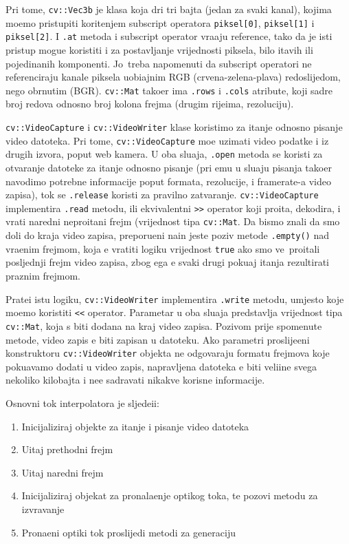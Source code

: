 Pri tome, \lstinline{cv::Vec3b} je klasa koja dr\zh i tri bajta (jedan za svaki kanal), kojima mo\zh emo pristupiti kori\sh tenjem subscript operatora \lstinline{piksel[0]}, \lstinline{piksel[1]} i \lstinline{piksel[2]}. 
I \lstinline{.at} metoda i subscript operator vra\cj aju reference, tako da je isti pristup mogu\cj e koristiti i za postavljanje vrijednosti piksela, bilo \ch itavih ili pojedina\ch nih komponenti. 
Jo\sh\ treba napomenuti da subscript operatori ne referenciraju kanale piksela uobi\ch ajnim RGB (crvena-zelena-plava) redoslijedom, nego obrnutim (BGR). \lstinline{cv::Mat} tako\dj er ima \lstinline{.rows} i 
\lstinline{.cols} atribute, koji sadr\zh e broj redova odnosno broj kolona frejma (drugim rije\ch ima, rezoluciju).

\lstinline{cv::VideoCapture} i \lstinline{cv::VideoWriter} klase koristimo za \ch itanje odnosno pisanje video datoteka. Pri tome, \lstinline{cv::VideoCapture} mo\zh e uzimati video podatke i iz drugih izvora,
poput web kamera. U oba slu\ch aja, \lstinline{.open} metoda se koristi za otvaranje datoteke za \ch itanje odnosno pisanje (pri \ch emu u slu\ch aju pisanja tako\dj er navodimo potrebne informacije poput
formata, rezolucije, i framerate-a video zapisa), tok se \lstinline{.release} koristi za pravilno zatvaranje. \lstinline{cv::VideoCapture} implementira \lstinline{.read} metodu, ili ekvivalentni \lstinline{>>} operator koji
pro\ch ita, dekodira, i vrati naredni nepro\ch itani frejm (vrijednost tipa \lstinline{cv::Mat}. Da bismo znali da smo do\sh li do kraja video zapisa, preporu\ch eni na\ch in jeste poziv metode \lstinline{.empty()} 
nad vra\cj enim frejmom, koja \cj e vratiti logi\ch ku vrijednost \lstinline{true} ako smo ve\cj\ pro\ch itali posljednji frejm video zapisa, zbog \ch ega \cj e svaki drugi poku\sh aj \ch itanja rezultirati praznim frejmom.

Prate\cj i istu logiku, \lstinline{cv::VideoWriter} implementira \lstinline{.write} metodu, umjesto koje mo\zh emo koristiti \lstinline{<<} operator. Parametar u oba slu\ch aja predstavlja vrijednost tipa
\lstinline{cv::Mat}, koja \cj s biti dodana na kraj video zapisa. Pozivom prije spomenute metode, video zapis \cj e biti zapisan u datoteku. Ako parametri proslije\dj eni konstruktoru \lstinline{cv::VideoWriter}
objekta ne odgovaraju formatu frejmova koje poku\sh avamo dodati u video zapis, napravljena datoteka \cj e biti veli\ch ine svega nekoliko kilobajta i ne\cj e sadr\zh avati nikakve korisne informacije.


Osnovni tok interpolatora je sljede\cj ii:
\begin{enumerate}
\item Inicijaliziraj objekte za \ch itanje i pisanje video datoteka
\item U\ch itaj prethodni frejm
\item U\ch itaj naredni frejm
\item Inicijaliziraj objekat za pronala\zh enje opti\ch kog toka, te pozovi metodu za izvr\sh avanje
\item Prona\dj eni opti\ch ki tok proslijedi metodi za generaciju
\end{enumerate}